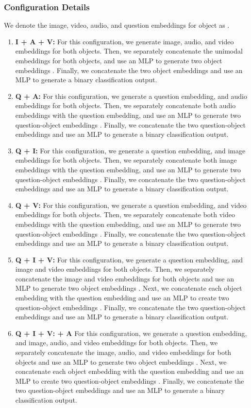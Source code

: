 \documentclass[runningheads]{llncs}
\begin{document}
\subsubsection{Configuration Details}

We denote the image, video, audio, and question embeddings for object  as . 

\begin{enumerate}
    \item \textbf{I + A + V:} For this configuration, we generate image, audio, and video embeddings for both objects. Then, we separately concatenate the unimodal embeddings for both objects, and use an MLP to generate two object embeddings . Finally, we concatenate the two object embeddings and use an MLP to generate a binary classification output. 
    \item \textbf{Q + A:} For this configuration, we generate a question embedding, and audio embeddings for both objects. Then, we separately concatenate both audio embeddings with the question embedding, and use an MLP to generate two question-object embeddings . Finally, we concatenate the two question-object embeddings and use an MLP to generate a binary classification output.  
    \item \textbf{Q + I:} For this configuration, we generate a question embedding, and image embeddings for both objects. Then, we separately concatenate both image embeddings with the question embedding, and use an MLP to generate two question-object embeddings . Finally, we concatenate the two question-object embeddings and use an MLP to generate a binary classification output.  
    \item \textbf{Q + V:} For this configuration, we generate a question embedding, and video embeddings for both objects. Then, we separately concatenate both video embeddings with the question embedding, and use an MLP to generate two question-object embeddings . Finally, we concatenate the two question-object embeddings and use an MLP to generate a binary classification output.  
    \item \textbf{Q + I + V:} For this configuration, we generate a question embedding, and image and video embeddings for both objects. Then, we separately concatenate the image and video embeddings for both objects and use an MLP to generate two object embeddings . Next, we concatenate each object embedding with the question embedding and use an MLP to create two question-object embeddings . Finally, we concatenate the two question-object embeddings and use an MLP to generate a binary classification output. 
    \item \textbf{Q + I + V: + A} For this configuration, we generate a question embedding, and image, audio, and video embeddings for both objects. Then, we separately concatenate the image, audio, and video embeddings for both objects and use an MLP to generate two object embeddings . Next, we concatenate each object embedding with the question embedding and use an MLP to create two question-object embeddings . Finally, we concatenate the two question-object embeddings and use an MLP to generate a binary classification output. 
\end{enumerate}
\end{document}
